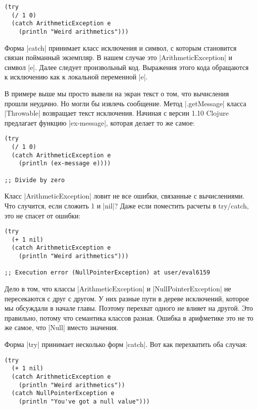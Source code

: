 \begin{verbatim}
(try
  (/ 1 0)
  (catch ArithmeticException e
    (println "Weird arithmetics")))
\end{verbatim}

Форма \spverb|catch| принимает класс исключения и символ, с которым становится связан
пойманный экземпляр. В нашем случае это \spverb|ArithmeticException| и символ
\spverb|e|. Далее следует произвольный код. Выражения этого кода обращаются к
исключению как к локальной переменной \spverb|e|.

В примере выше мы просто вывели на экран текст о том, что вычисления прошли
неудачно. Но могли бы извлечь сообщение. Метод \spverb|.getMessage| класса \spverb|Throwable|
возвращает текст исключения. Начиная с версии 1.10 Clojure предлагает функцию
\spverb|ex-message|, которая делает то же самое:

\begin{verbatim}
(try
  (/ 1 0)
  (catch ArithmeticException e
    (println (ex-message e))))

;; Divide by zero
\end{verbatim}

Класс \spverb|ArithmeticException| ловит не все ошибки, связанные с вычислениями. Что
случится, если сложить 1 и \spverb|nil|? Даже если поместить расчеты в try/catch, это
не спасет от ошибки:

\begin{verbatim}
(try
  (+ 1 nil)
  (catch ArithmeticException e
    (println "Weird arithmetics")))

;; Execution error (NullPointerException) at user/eval6159
\end{verbatim}

Дело в том, что классы \spverb|ArithmeticException| и \spverb|NullPointerException| не
пересекаются с друг с другом. У них разные пути в дереве исключений, которое мы
обсуждали в начале главы. Поэтому перехват одного не влияет на другой. Это
правильно, потому что семантика классов разная. Ошибка в арифметике это не то же
самое, что \spverb|Null| вместо значения.

Форма \spverb|try| принимает несколько форм \spverb|catch|. Вот как перехватить оба случая:

\begin{verbatim}
(try
  (+ 1 nil)
  (catch ArithmeticException e
    (println "Weird arithmetics"))
  (catch NullPointerException e
    (println "You've got a null value")))
\end{verbatim}

